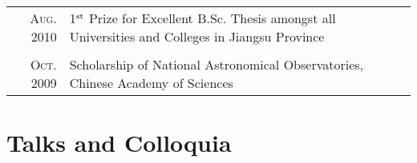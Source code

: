 \documentclass[letterpaper,12pt]{article}
\newcommand{\narrow}{-1.6ex}
\newcommand{\textwrap}{5.3in}
\begin{document}
\begin{longtable}{r|p{\textwrap}}
    \textsc{Aug. 2010} & 1$^{\rm st}$ Prize for Excellent B.Sc. Thesis amongst all Universities and Colleges in Jiangsu Province   \\
    \multicolumn{2}{c}{} \\[\narrow]
    \textsc{Oct. 2009} & Scholarship of National Astronomical Observatories, Chinese Academy of Sciences
\end{longtable}


\section{Talks and Colloquia}
\end{document}
